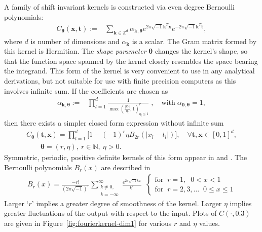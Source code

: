 \documentclass{iitthesis}          %
\newcommand{\bm}[1]{\boldsymbol{#1}}
\newcommand{\naturals}{\mathbb{N}}
\newcommand{\vtheta}{{\bm{\theta}}}
\newcommand{\vk}{\bm{k}}
\newcommand{\vt}{\bm{t}}
\newcommand{\vx}{\bm{x}}
\newcommand\figref{Figure~\ref}
\begin{document}
A family of shift invariant kernels is constructed via even degree Bernoulli polynomials:
\begin{align*}
C_\vtheta(\vx, \vt) := &  \sum_{\vk \in \mathbb{Z}^d} \alpha_{\vk,\vtheta}  e^{2 \pi\sqrt{-1} \vk^T\vx}
e^{-2 \pi\sqrt{-1} \vk^T\vt},
\end{align*}
where $d$ is number of dimensions and $\alpha_{\vk}$ is a scalar. The Gram matrix formed by this kernel is Hermitian. 
The \textit{shape parameter} $\vtheta$ changes the kernel's shape, so that the function space spanned by the kernel closely resembles the space bearing the integrand. 
This form of the kernel is very convenient to use in any analytical derivations, but not suitable for use with finite precision computers as this involves infinite sum. 
If the coefficients are chosen as 
\begin{align*}
\alpha_{\vk,\vtheta} := & \prod_{l=1}^d \frac{1}{\max(\frac{|k_l|}{\eta_l},1)^r_{\eta_l\leq 1}}  \;,  \quad \text{with} \; {\alpha}_{\bm{0},\vtheta} = 1,
\end{align*}
then there exists a simpler closed form expression without infinite sum
\begin{align}
\label{the_kernel_eqn_bernoulli}
C_\vtheta(\vt, \vx) =
\prod_{l=1}^d \biggl[
1 - (-1)^{r} \eta B_{2r}( |{x_l-t_l}| ) \biggr], \quad  
\forall \vt,\vx \in [0,1]^d, \\ \qquad  \vtheta = (r,\eta), \ r \in \naturals, \ \eta > 0.
\end{align}
Symmetric, periodic, positive definite kernels of this form appear in  \cite{DicEtal14a} and \cite{Hic96a}.  The Bernoulli polynomials $B_{r}(x)$ are described in \cite[Chapter 24]{OlvEtal10a}
\begin{align*}
B_{r}(x) = \frac{-r!}{(2 \pi \sqrt{-1})^{r}} 
\sum_{\substack{k \neq 0,\\ k=-\infty}}^\infty 
\frac{e^{2\pi\sqrt{-1} k x}}{k^{r}}
\;\;
\begin{cases}
\text{for} \;\; r=1, \;\; 0 < x < 1 \\
\text{for} \;\; r=2,3,\hdots \;\; 0 \leq x \leq 1
\end{cases}
\end{align*}
Larger `$r$' implies a greater degree of smoothness of the kernel.  Larger $\eta$ implies greater fluctuations of the output with respect to the input.  Plots of $C(\cdot, 0.3)$ are given in \figref{fig:fourierkernel-dim1} for various $r$ and $\eta$ values.
\end{document}
